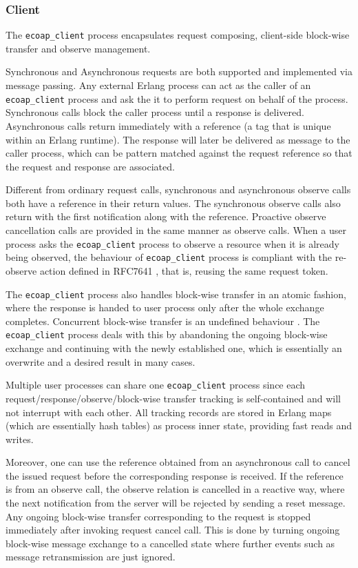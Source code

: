 \subsubsection{Client}

The \verb|ecoap_client| process encapsulates request composing, client-side block-wise transfer and observe management. 

Synchronous and Asynchronous requests are both supported and implemented via message passing. Any external Erlang process can act as the caller of an \verb|ecoap_client| process and ask the it to perform request on behalf of the process. Synchronous calls block the caller process until a response is delivered. Asynchronous calls return immediately with a reference (a tag that is unique within an Erlang runtime). The response will later be delivered as message to the caller process, which can be pattern matched against the request reference so that the request and response are associated. 

Different from ordinary request calls, synchronous and asynchronous observe calls both have a reference in their return values. The synchronous observe calls also return with the first notification along with the reference. Proactive observe cancellation calls are provided in the same manner as observe calls. When a user process asks the \verb|ecoap_client| process to observe a resource when it is already being observed, the behaviour of \verb|ecoap_client| process is compliant with the re-observe action defined in RFC7641 \cite{coap_observe}, that is, reusing the same request token.

The \verb|ecoap_client| process also handles block-wise transfer in an atomic fashion, where the response is handed to user process only after the whole exchange completes. Concurrent block-wise transfer is an undefined behaviour \cite{blockwise}. The \verb|ecoap_client| process deals with this by abandoning the ongoing block-wise exchange and continuing with the newly established one, which is essentially an overwrite and a desired result in many cases.

Multiple user processes can share one \verb|ecoap_client| process since each request/response/observe/block-wise transfer tracking is self-contained and will not interrupt with each other. All tracking records are stored in Erlang maps (which are essentially hash tables) as process inner state, providing fast reads and writes.

Moreover, one can use the reference obtained from an asynchronous call to cancel the issued request before the corresponding response is received. If the reference is from an observe call, the observe relation is cancelled in a reactive way, where the next notification from the server will be rejected by sending a reset message. Any ongoing block-wise transfer corresponding to the request is stopped immediately after invoking request cancel call. This is done by turning ongoing block-wise message exchange to a cancelled state where further events such as message retransmission are just ignored.


